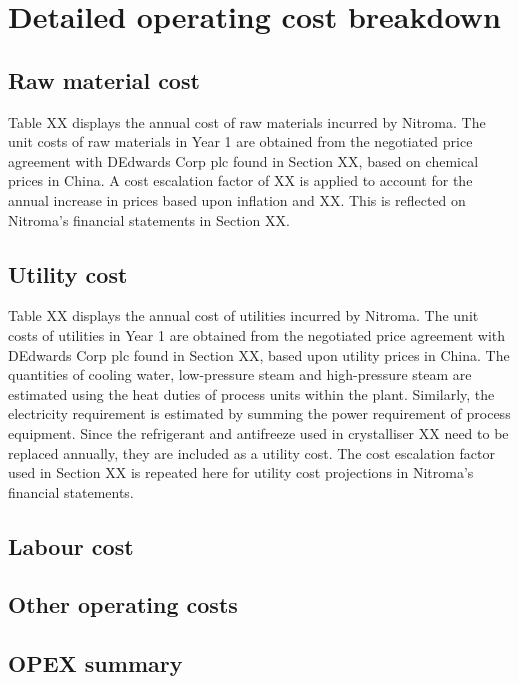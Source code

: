 \section{Detailed operating cost breakdown}
\subsection{Raw material cost}
Table XX displays the annual cost of raw materials incurred by Nitroma. The unit costs of raw materials in Year 1 are obtained from the negotiated price agreement with DEdwards Corp plc found in Section XX, based on chemical prices in China. A cost escalation factor of XX is applied to account for the annual increase in prices based upon inflation and XX. This is reflected on Nitroma’s financial statements in Section XX.

\subsection{Utility cost}
Table XX displays the annual cost of utilities incurred by Nitroma. The unit costs of utilities in Year 1 are obtained from the negotiated price agreement with DEdwards Corp plc found in Section XX, based upon utility prices in China. The quantities of cooling water, low-pressure steam and high-pressure steam are estimated using the heat duties of process units within the plant. Similarly, the electricity requirement is estimated by summing the power requirement of process equipment. Since the refrigerant and antifreeze used in crystalliser XX need to be replaced annually, they are included as a utility cost. The cost escalation factor used in Section XX is repeated here for utility cost projections in Nitroma’s financial statements. 

\subsection{Labour cost}
\subsection{Other operating costs}
\subsection{OPEX summary}